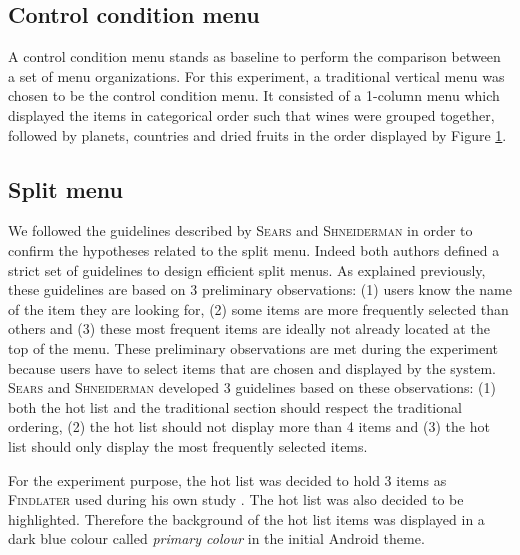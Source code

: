 \begin{figure}[!ht]
    
    \label{fig:items}
\end{figure}

\subsection{Control condition menu}
A control condition menu stands as baseline to perform the comparison between a 
set of menu organizations. For this experiment, a traditional vertical menu 
was chosen to be the control condition menu. It consisted of a 1-column menu 
which displayed the items in categorical order such that wines were grouped 
together, followed by planets, countries and dried fruits in the order 
displayed 
by Figure \ref{fig:items}.

%     

\subsection{Split menu}
We followed the guidelines described by \textsc{Sears} and \textsc{Shneiderman} 
in order to 
confirm the hypotheses related to the split menu. Indeed both authors defined a 
strict set of guidelines to design efficient split menus. As explained 
previously, these guidelines are based on 3 preliminary observations: (1) 
users know the name of the item they are looking for, (2) some items are 
more frequently selected than others and (3) these most frequent items are 
ideally not already located at the top of the menu. These preliminary 
observations are met during the experiment because users have to select items 
that are chosen and displayed by the system. \textsc{Sears} and 
\textsc{Shneiderman} developed 3 
guidelines based on these observations: (1) both the hot list and the 
traditional section should respect the traditional ordering, (2) the hot list 
should not display more than 4 items and (3) the hot list should only display 
the most frequently selected items.\newline

For the experiment purpose, the hot list was decided to hold 3 items as 
\textsc{Findlater} used during his own study \cite{findlater}. The hot list was 
also 
decided to be highlighted. Therefore the background of the hot list items was 
displayed in a dark blue colour called \textit{primary colour} in the initial 
Android theme.

